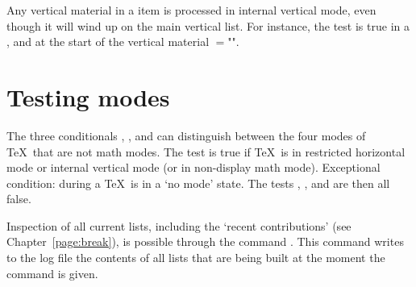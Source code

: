 \documentclass{book}
\begin{document}
Any vertical material in a  item is processed
in internal vertical mode, even though it will wind up
on the main vertical list. For instance, the 
test is true in a , and at the start
\mdqon
of the vertical material $=$""\n{-1000pt}.
\mdqoff

\section{Testing modes}

The three conditionals , , and
 can distinguish between the four modes of
\TeX\ that are not math modes.
The  test is true if \TeX\ is in 
restricted horizontal mode or internal vertical mode
(or in non-display math mode).
Exceptional condition: during a  \TeX\
is in a `no mode' state. The tests ,
, and  are then all false.

Inspection of all current lists, including the `recent
contributions' (see Chapter~\ref{page:break}),
is possible through the command \label{showlists}.
This command writes to the log file the contents of all
lists that are being built at the moment the command is given.
\end{document}
